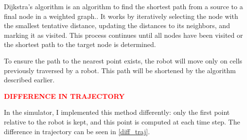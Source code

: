 \documentclass[../main.tex]{subfiles}
\begin{document}
Dijkstra's algorithm is an algorithm to find the shortest path from a source to a final node in a weighted graph.\cite{dijkstra_1959}. It works by iteratively selecting the node with the smallest tentative distance, updating the distances to its neighbors, and marking it as visited. This process continues until all nodes have been visited or the shortest path to the target node is determined.\cite{dijkstra_anim_wiki_2025}


To ensure the path to the nearest point exists, the robot will move only on cells previously traversed by a robot. This path will be shortened by the algorithm described earlier.




\textcolor{red}{\textbf{DIFFERENCE IN TRAJECTORY}}


In the simulator, I implemented this method differently: only the first point relative to the robot is kept, and this point is computed at each time step. The difference in trajectory can be seen in \autoref{diff_traj}.

\figtonum
\end{document}
